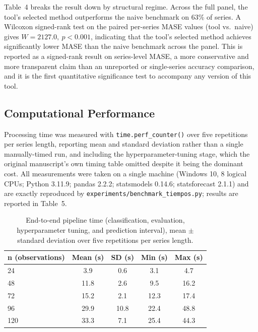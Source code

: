 \documentclass[forecasting,article,submit,pdftex,moreauthors]{Definitions/mdpi}
\begin{document}
Table~4 breaks the result down by structural regime. Across the full panel, the tool's selected method outperforms the naive benchmark on 63\% of series. A Wilcoxon signed-rank test on the paired per-series MASE values (tool vs.\ naive) gives $W=2127.0,\ p<0.001$, indicating that the tool's selected method achieves significantly lower MASE than the naive benchmark across the panel. This is reported as a signed-rank result on series-level MASE, a more conservative and more transparent claim than an unreported or single-series accuracy comparison, and it is the first quantitative significance test to accompany any version of this tool.

\subsection{Computational Performance}
\label{sec:computo}

Processing time was measured with \texttt{time.perf\_counter()} over five repetitions per series length, reporting mean and standard deviation rather than a single manually-timed run, and including the hyperparameter-tuning stage, which the original manuscript's own timing table omitted despite it being the dominant cost. All measurements were taken on a single machine (Windows 10, 8 logical CPUs; Python 3.11.9; pandas 2.2.2; statsmodels 0.14.6; statsforecast 2.1.1) and are exactly reproduced by \texttt{experiments/benchmark\_tiempos.py}; results are reported in Table~5.

\begin{table}[H]
\caption{End-to-end pipeline time (classification, evaluation, hyperparameter tuning, and prediction interval), mean $\pm$ standard deviation over five repetitions per series length.\label{tab:tiempos}}
\centering
\begin{tabularx}{\textwidth}{Xcccc}
\toprule
\textbf{n (observations)} & \textbf{Mean (s)} & \textbf{SD (s)} & \textbf{Min (s)} & \textbf{Max (s)} \\
\midrule
24  & 3.9  & 0.6  & 3.1  & 4.7  \\
48  & 11.8 & 2.6  & 9.5  & 16.2 \\
72  & 15.2 & 2.1  & 12.3 & 17.4 \\
96  & 29.9 & 10.8 & 22.4 & 48.8 \\
120 & 33.3 & 7.1  & 25.4 & 44.3 \\
\bottomrule
\end{tabularx}
\end{table}
\end{document}
